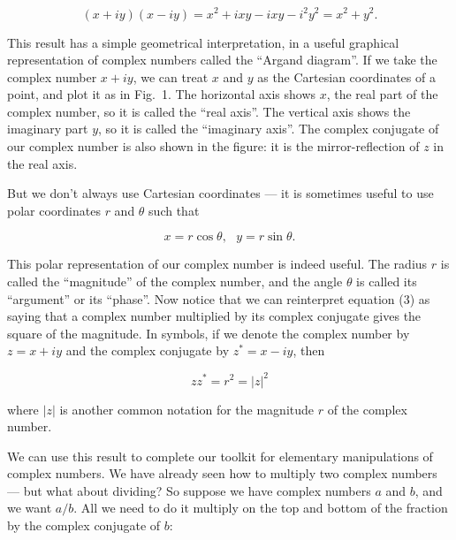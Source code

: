   \begin{equation*}(x+iy)(x-iy)=x^2 +ixy -ixy -i^2 y^2 = x^2 + y^2. 
  \tag{3}\end{equation*} 

  This result has a simple geometrical interpretation, in a useful graphical 
  representation of complex numbers called the ``Argand diagram''. If we take 
  the complex number $x+iy$, we can treat $x$ and $y$ as the Cartesian 
  coordinates of a point, and plot it as in Fig.\ 1. The horizontal axis shows 
  $x$, the real part of the complex number, so it is called the ``real axis''. 
  The vertical axis shows the imaginary part $y$, so it is called the 
  ``imaginary axis''. The complex conjugate of our complex number is also shown 
  in the figure: it is the mirror-reflection of $z$ in the real axis. 


  But we don't always use Cartesian coordinates --- it is sometimes useful to 
  use polar coordinates $r$ and $\theta$ such that 

  \begin{equation*}x=r \cos \theta, \mathrm{~~~} y=r \sin \theta. 
  \tag{4}\end{equation*} 

  This polar representation of our complex number is indeed useful. The radius 
  $r$ is called the ``magnitude'' of the complex number, and the angle $\theta$ 
  is called its ``argument'' or its ``phase''. Now notice that we can 
  reinterpret equation (3) as saying that a complex number multiplied by its 
  complex conjugate gives the square of the magnitude. In symbols, if we denote 
  the complex number by $z=x+iy$ and the complex conjugate by $z^*=x-iy$, then 

  \begin{equation*}z z^* =r^2 =|z|^2 \tag{5}\end{equation*} 

  \noindent{}where $|z|$ is another common notation for the magnitude $r$ of 
  the complex number. 

  We can use this result to complete our toolkit for elementary manipulations 
  of complex numbers. We have already seen how to multiply two complex numbers 
  --- but what about dividing? So suppose we have complex numbers $a$ and $b$, 
  and we want $a/b$. All we need to do it multiply on the top and bottom of the 
  fraction by the complex conjugate of $b$: 

